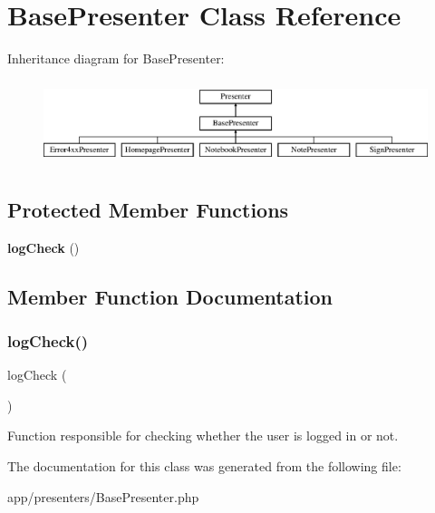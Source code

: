 \section{Base\+Presenter Class Reference}
\label{class_app_1_1_presenters_1_1_base_presenter}
Inheritance diagram for Base\+Presenter\+:\begin{figure}[H]
\begin{center}
\leavevmode
\includegraphics[height=2.488889cm]{class_app_1_1_presenters_1_1_base_presenter}
\end{center}
\end{figure}
\subsection*{Protected Member Functions}
\begin{DoxyCompactItemize}
\item 
\textbf{ log\+Check} ()
\end{DoxyCompactItemize}


\subsection{Member Function Documentation}
\mbox{\label{class_app_1_1_presenters_1_1_base_presenter_ac82bc6601e7d9ed8f142734573463465}} 
\subsubsection{log\+Check()}
{\footnotesize\ttfamily log\+Check (\begin{DoxyParamCaption}{ }\end{DoxyParamCaption})\hspace{0.3cm}{\ttfamily [protected]}}

Function responsible for checking whether the user is logged in or not. 

The documentation for this class was generated from the following file\+:\begin{DoxyCompactItemize}
\item 
app/presenters/Base\+Presenter.\+php\end{DoxyCompactItemize}
